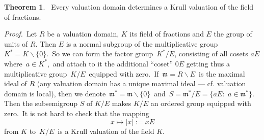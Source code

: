 \documentclass[12pt]{article}
\theoremstyle{definition}
\newtheorem*{thmplain}{Theorem}
\begin{document}
\begin{thmplain}
\, Every valuation domain determines a Krull valuation of the field of fractions.
\end{thmplain}

{\em Proof.} \,Let $R$ be a valuation domain, $K$ its field of fractions and $E$ the group of units of $R$.  Then $E$ is a normal subgroup of the multiplicative group\, $K^* = K\!\smallsetminus\!\{0\}$.\, So we can form the factor group\, $K^*/E$, consisting of all cosets $aE$ where\, $a\in K^*$,\, and attach to it the additional ``coset'' $0E$ getting thus a multiplicative group\, $K/E$\, equipped with zero.\, If\, $\mathfrak{m} = R\!\smallsetminus\!E$\, is the maximal ideal of $R$ (any valuation domain has a unique maximal ideal 
--- cf. valuation domain is local), then we denote\, $\mathfrak{m}^* = \mathfrak{m}\!\smallsetminus\!\{0\}$\, and\, $S = \mathfrak{m}^*/E = \{aE:\,\,a\in \mathfrak{m}^*\}$.\, Then the subsemigroup $S$ of $K/E$ makes $K/E$ an ordered group equipped with zero.\, It is not hard to check that the mapping
                         $$x\mapsto |x| := xE$$
from $K$ to\, $K/E$\, is a Krull valuation of the field $K$.
\end{document}
